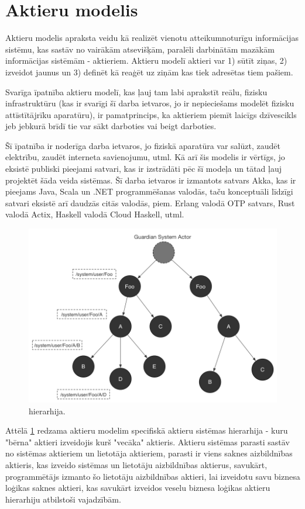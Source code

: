 \section{Aktieru modelis}
\label{sec:actormodel}

Aktieru modelis apraksta veidu kā realizēt vienotu atteikumnoturīgu informācijas
sistēmu, kas sastāv no vairākām atsevišķām, paralēli darbinātām mazākām
informācijas sistēmām - aktieriem. Aktieru modelī aktieri var 1) sūtīt ziņas, 2)
izveidot jaunus  un 3) definēt kā reaģēt uz ziņām kas
tiek adresētas tiem pašiem. \cite[p. 1]{CarlHewitt2010}

Svarīga īpatnība aktieru modelī, kas ļauj tam labi aprakstīt reālu, fizisku
infrastruktūru (kas ir svarīgi šī darba ietvaros, jo ir nepieciešams modelēt
fizisku attīstītājrīku aparatūru), ir pamatprincips, ka aktieriem piemīt laicīgs
dzīvescikls jeb jebkurā brīdī tie var sākt darboties vai beigt darboties.
\cite[p. 6]{CarlHewitt2010} 
 
Šī īpatnība ir noderīga darba ietvaros, jo fiziskā aparatūra var salūzt, zaudēt
elektrību, zaudēt interneta savienojumu, utml. Kā arī šis modelis ir vērtīgs, jo
eksistē publiski pieejami satvari, kas ir izstrādāti pēc šī modeļa un tātad ļauj
projektēt šāda veida sistēmas. Šī darba ietvaros ir izmantots satvars Akka, kas
ir pieejams Java, Scala un .NET programmēšanas valodās, taču konceptuāli līdzīgi
satvari eksistē arī daudzās citās valodās, piem. Erlang valodā OTP satvars, Rust
valodā Actix, Haskell valodā Cloud Haskell, utml.

\begin{figure}[H]
    \includegraphics[width=0.5\linewidth]{assets/akka-actor-hierarchy-gray.png}
    \centering
    \caption{ hierarhija.
    \cite[sl. 34]{MarkusJuraAkka}}
    \label{fig:actorsystem}
\end{figure}

Attēlā \ref{fig:actorsystem} redzama aktieru modelim specifiskā aktieru sistēmas
hierarhija - kuru "bērna" aktieri izveidojis kurš "vecāka" aktieris. Aktieru
sistēmas parasti sastāv no sistēmas aktieriem un lietotāja aktieriem, parasti ir
viens saknes aizbildnības aktieris, kas izveido sistēmas un lietotāju
aizbildnības aktierus, savukārt, programmētājs izmanto šo lietotāju aizbildnības
aktieri, lai izveidotu savu biznesa loģikas saknes aktieri, kas savukārt
izveidos veselu biznesa loģikas aktieru hierarhiju atbilstoši vajadzībām.
\cite[para. The Akka actor hierarchy]{LightbendAkka2619}

